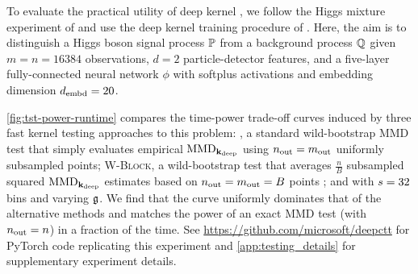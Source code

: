 %


%
%

%
%

To evaluate the practical utility of deep kernel \ctt, we follow the Higgs mixture experiment of \citet[Sec.~5]{domingoenrich2023compresstestpowerfulkernel} and use the deep kernel training procedure of \citet[Tab.~1]{liu2020learning}.
%
Here, the aim is to distinguish a Higgs boson signal process $\P$ from a background process $\Q$ given $m=n=16384$ observations,  $d=2$ particle-detector features, and a five-layer fully-connected neural network $\phi$ with softplus activations and embedding dimension $\dembd = 20$.

\cref{fig:tst-power-runtime} compares the time-power trade-off curves induced by three fast kernel testing approaches to this problem: \subsampling, a standard wild-bootstrap MMD test \citep{chwialkowski2014wild} that simply evaluates empirical $\mmd_{\kdeep}$ using $\nout=m_{\tout}$ uniformly subsampled points; \textsc{W-Block}, a wild-bootstrap test that averages $\frac{n}{B}$ subsampled squared $\mmd_{\kdeep}$  estimates based on $\nout=m_{\tout} =B$ points \citep{zaremba2013b}; and \ctt with $\sblock=32$ bins and varying $\ossymb$.
We find that the \ctt curve uniformly dominates that of the alternative methods and matches the power of an exact MMD test (\subsampling with $\nout=n$) in a fraction of the time. 
%
See \url{https://github.com/microsoft/deepctt} for PyTorch code replicating this experiment and \cref{app:testing_details} 
for supplementary experiment details.